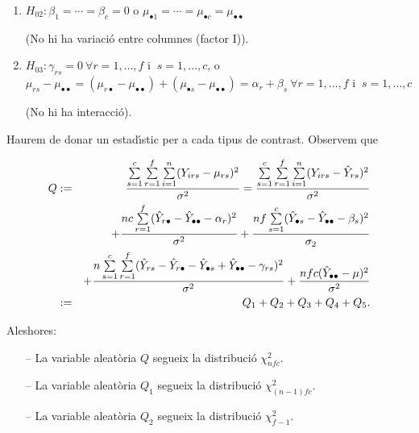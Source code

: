 \begin{enumerate}
\begin{enumerate}
(No hi ha variaci\'o entre files (factor II)).

\item $H_{02} : \beta_1 = \cdots = \beta_c = 0$ o $\mu_{\bullet 1} = \cdots = 
\mu_{\bullet c} =
\mu_{\bullet\bullet}$

(No hi ha variaci\'o entre columnes (factor I)).

\item $H_{03} : \gamma_{rs} = 0 \ \forall r = 1, \ldots , f $ i $ \ s = 1, \ldots
,c$, o $\mu_{rs} - \mu_{\bullet\bullet} = (\mu_{r\bullet} - \mu_{\bullet\bullet}) + 
(\mu_{\bullet s} - 
\mu_{\bullet\bullet}) = \alpha_r + \beta_s \ \forall r = 1, \ldots , f $ i $ \ s = 1, \ldots ,c$

(No hi ha interacci\'o).
\end{enumerate}

Haurem de donar un estad\'{\i}stic per a cada tipus de contrast. Observem que

\begin{eqnarray*}
Q & := &  {\sum\limits_{s=1}^c \sum\limits_{r=1}^f \sum\limits_{i=1}^n (Y_{irs} -
\mu_{rs})^2 \over \sigma^2} = {\sum\limits_{s=1}^c \sum\limits_{r=1}^f
\sum\limits_{i=1}^n (Y_{irs} - \hat{Y}_{rs})^2 \over \sigma^2} \\ && + {n c
\sum\limits_{r=1}^f (\hat{Y}_{r\bullet} - \hat{Y}_{\bullet\bullet} - \alpha_r)^2 \over \sigma^2} +
{n f \sum\limits_{s=1}^c (\hat{Y}_{\bullet s} - \hat{Y}_{\bullet\bullet} - \beta_s)^2 \over
\sigma_2} \\ && + {n \sum\limits_{s=1}^c \sum\limits_{r=1}^f (\hat{Y}_{rs} -
\hat{Y}_{r\bullet} - \hat{Y}_{\bullet s} + \hat{Y}_{\bullet\bullet} - \gamma_{rs})^2 \over \sigma^2} + {n
f c (\hat{Y}_{\bullet\bullet} - \mu)^2 \over \sigma^2} \\ & := & Q_1 + Q_2 + Q_3 + Q_4 + Q_5.
\end{eqnarray*}

Aleshores:
\begin{itemize}
\item[--] La variable aleat\`oria $Q$ segueix la distribuci\'o $\chi_{n f c}^2$.

\item[--] La variable aleat\`oria $Q_1$ segueix la distribuci\'o $\chi_{(n-1) f c}^2$.

\item[--] La variable aleat\`oria $Q_2$ segueix la distribuci\'o $\chi_{f-1}^2$.


\end{itemize}
\end{enumerate}
